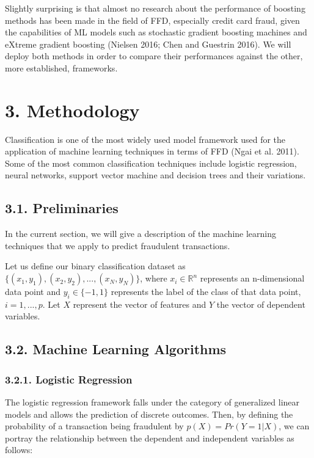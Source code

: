 \documentclass[12pt,]{article}
\begin{document}
Slightly surprising is that almost no research about the performance of
boosting methods has been made in the field of FFD, especially credit
card fraud, given the capabilities of ML models such as stochastic
gradient boosting machines and eXtreme gradient boosting (Nielsen 2016;
Chen and Guestrin 2016). We will deploy both methods in order to compare
their performances against the other, more established, frameworks.

\hypertarget{methodology}{%
\section{3. Methodology}\label{methodology}}

Classification is one of the most widely used model framework used for
the application of machine learning techniques in terms of FFD (Ngai et
al. 2011). Some of the most common classification techniques include
logistic regression, neural networks, support vector machine and
decision trees and their variations.

\hypertarget{preliminaries}{%
\subsection{3.1. Preliminaries}\label{preliminaries}}

In the current section, we will give a description of the machine
learning techniques that we apply to predict fraudulent transactions.

Let us define our binary classification dataset as
\({\{(x_1,y_1),(x_2,y_2),...,(x_N,y_N)\}}\), where
\(x_i\in \mathbb{R}^n\) represents an n-dimensional data point and
\(y_i \in \{-1,1\}\) represents the label of the class of that data
point, \(i = 1,...,p\). Let \(X\) represent the vector of features and
\(Y\) the vector of dependent variables.

\hypertarget{machine-learning-algorithms}{%
\subsection{3.2. Machine Learning
Algorithms}\label{machine-learning-algorithms}}

\hypertarget{logistic-regression}{%
\subsubsection{3.2.1. Logistic Regression}\label{logistic-regression}}

The logistic regression framework falls under the category of
generalized linear models and allows the prediction of discrete
outcomes. Then, by defining the probability of a transaction being
fraudulent by \(p(X) = Pr(Y=1|X)\), we can portray the relationship
between the dependent and independent variables as follows:
\end{document}
